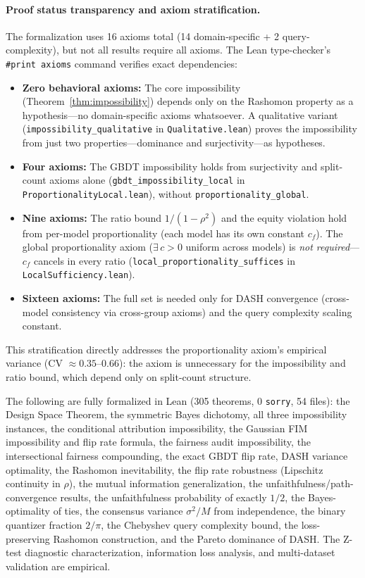 \documentclass{article}
\begin{document}
\paragraph{Proof status transparency and axiom stratification.}
\begin{sloppypar}
The formalization uses 16 axioms total (14 domain-specific + 2 query-complexity),
but not all results require all axioms. The Lean type-checker's
\texttt{\#print axioms} command verifies exact dependencies:
\begin{itemize}
\item \textbf{Zero behavioral axioms:} The core impossibility
(Theorem~\ref{thm:impossibility}) depends only on the Rashomon property as a
hypothesis---no domain-specific axioms whatsoever. A qualitative variant
(\texttt{impossibility\allowbreak\_qualitative} in \texttt{Qualitative.lean}) proves
the impossibility from just two properties---dominance and surjectivity---as
hypotheses.
\item \textbf{Four axioms:} The GBDT impossibility holds from surjectivity and
split-count axioms alone (\texttt{gbdt\allowbreak\_impossibility\allowbreak\_local}
in \texttt{Proportionality\allowbreak Local.lean}), without
\texttt{proportionality\allowbreak\_global}.
\item \textbf{Nine axioms:} The ratio bound $1/(1{-}\rho^2)$ and the equity
violation hold from per-model proportionality (each model has its own constant $c_f$).
The global proportionality axiom ($\exists\, c > 0$ uniform across models) is
\emph{not required}---$c_f$ cancels in every ratio
(\texttt{local\allowbreak\_proportionality\allowbreak\_suffices} in
\texttt{LocalSufficiency.lean}).
\item \textbf{Sixteen axioms:} The full set is needed only for DASH convergence
(cross-model consistency via cross-group axioms) and the query complexity scaling
constant.
\end{itemize}
\end{sloppypar}
This stratification directly addresses the proportionality axiom's empirical variance (CV $\approx 0.35$--$0.66$): the axiom is unnecessary for the impossibility and ratio bound, which depend only on split-count structure.

The following are fully formalized in Lean (305 theorems, 0 \texttt{sorry}, 54 files): the Design Space Theorem, the symmetric Bayes dichotomy, all three impossibility instances, the conditional attribution impossibility, the Gaussian FIM impossibility and flip rate formula, the fairness audit impossibility, the intersectional fairness compounding, the exact GBDT flip rate, DASH variance optimality, the Rashomon inevitability, the flip rate robustness (Lipschitz continuity in $\rho$), the mutual information generalization, the unfaithfulness/path-convergence results, the unfaithfulness probability of exactly $1/2$, the Bayes-optimality of ties, the consensus variance $\sigma^2/M$ from independence, the binary quantizer fraction $2/\pi$, the Chebyshev query complexity bound, the loss-preserving Rashomon construction, and the Pareto dominance of DASH. The Z-test diagnostic characterization, information loss analysis, and multi-dataset validation are empirical.
\end{document}
